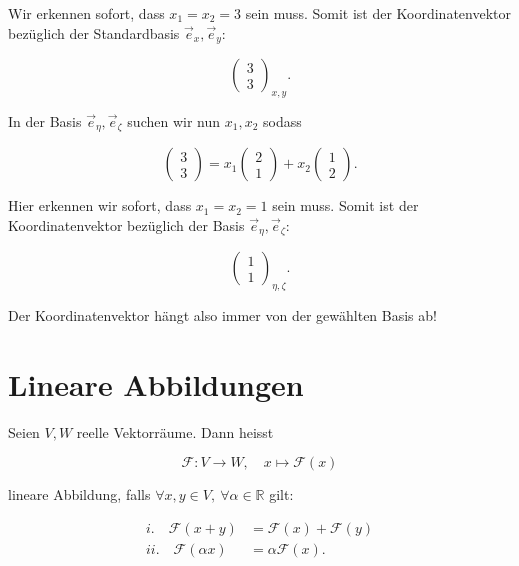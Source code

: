 Wir erkennen sofort, dass \( x_1 = x_2 = 3 \) sein muss. Somit ist der Koordinatenvektor bezüglich der Standardbasis \( \vec{e}_x, \vec{e}_y \): 

\begin{equation*}
    \begin{pmatrix} 3 \\ 3 \end{pmatrix}_{x,y}. 
\end{equation*}

In der Basis \( \vec{e}_\eta, \vec{e}_\zeta \) suchen wir nun \( x_1, x_2 \) sodass

\begin{equation*}
    \begin{pmatrix} 3 \\ 3 \end{pmatrix} = x_1 \begin{pmatrix} 2 \\ 1 \end{pmatrix} + x_2 \begin{pmatrix} 1 \\ 2 \end{pmatrix}.
\end{equation*}

Hier erkennen wir sofort, dass \( x_1 = x_2 = 1 \) sein muss. Somit ist der Koordinatenvektor bezüglich der Basis \( \vec{e}_\eta, \vec{e}_\zeta \):

\begin{equation*}
    \begin{pmatrix} 1 \\ 1 \end{pmatrix}_{\eta, \zeta}.
\end{equation*}

Der Koordinatenvektor hängt also immer von der gewählten Basis ab!

\newpage
\section{Lineare Abbildungen}  

\begin{tcolorbox}[colback=gray!30, colframe=gray!80, title=Lineare Abbildung]
Seien \( V, W \) reelle Vektorräume. Dann heisst

\begin{equation*}
    \mathcal{F}: V \rightarrow W, \quad x \mapsto \mathcal{F}(x)
\end{equation*}

\vspace{0.5\baselineskip}

lineare Abbildung, falls \( \forall x, y \in V, \ \forall \alpha \in \mathbb{R} \) gilt:

\begin{equation*}
    \begin{aligned}
        i. \quad \mathcal{F}(x + y) &= \mathcal{F}(x) + \mathcal{F}(y) \\
        ii. \quad \mathcal{F}(\alpha x) &= \alpha \mathcal{F}(x).
    \end{aligned}
\end{equation*}
\end{tcolorbox}

